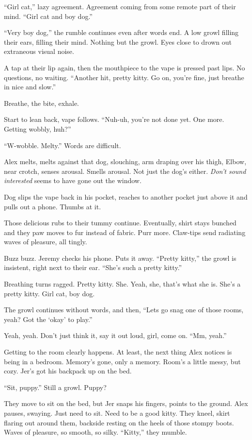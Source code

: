 ``Girl cat,'' lazy agreement. Agreement coming from some remote part of their mind. ``Girl cat and boy dog.''

``Very boy dog,'' the rumble continues even after words end. A low growl filling their ears, filling their mind. Nothing but the growl. Eyes close to drown out extraneous visual noise.

A tap at their lip again, then the mouthpiece to the vape is pressed past lips. No questions, no waiting. ``Another hit, pretty kitty. Go on, you're fine, just breathe in nice and slow.''

Breathe, the bite, exhale.

Start to lean back, vape follows. ``Nuh-uh, you're not done yet. One more. Getting wobbly, huh?''

``W-wobble. Melty.'' Words are difficult.

Alex melts, melts against that dog, slouching, arm draping over his thigh, Elbow, near crotch, senses arousal. Smells arousal. Not just the dog's either. \emph{Don't sound interested} seems to have gone out the window.

Dog slips the vape back in his pocket, reaches to another pocket just above it and pulls out a phone. Thumbs at it.

Those delicious rubs to their tummy continue. Eventually, shirt stays bunched and they paw moves to fur instead of fabric. Purr more. Claw-tips send radiating waves of pleasure, all tingly.

Buzz buzz. Jeremy checks his phone. Puts it away. ``Pretty kitty,'' the growl is insistent, right next to their ear. ``She's such a pretty kitty.''

Breathing turns ragged. Pretty kitty. She. Yeah, she, that's what she is. She's a pretty kitty. Girl cat, boy dog.

The growl continues without words, and then, ``Lets go snag one of those rooms, yeah? Got the `okay' to play.''

Yeah, yeah. Don't just think it, say it out loud, girl, come on. ``Mm, yeah.''

Getting to the room clearly happens. At least, the next thing Alex notices is being in a bedroom. Memory's gone, only a memory. Room's a little messy, but cozy. Jer's got his backpack up on the bed.

``Sit, puppy.'' Still a growl. Puppy?

They move to sit on the bed, but Jer snaps his fingers, points to the ground. Alex pauses, swaying. Just need to sit. Need to be a good kitty. They kneel, skirt flaring out around them, backside resting on the heels of those stompy boots. Waves of pleasure, so smooth, so silky. ``Kitty,'' they mumble.

